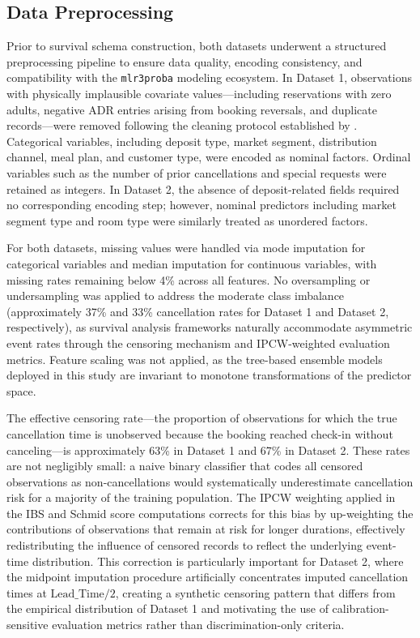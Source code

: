 \documentclass[pdflatex,sn-mathphys-ay]{sn-jnl}
\theoremstyle{thmstyleone}%
\theoremstyle{thmstyletwo}%
\theoremstyle{thmstylethree}%
\begin{document}
\subsection{Data Preprocessing}

Prior to survival schema construction, both datasets underwent a structured preprocessing pipeline to ensure data quality, encoding consistency, and compatibility with the \texttt{mlr3proba} modeling ecosystem. In Dataset 1, observations with physically implausible covariate values—including reservations with zero adults, negative ADR entries arising from booking reversals, and duplicate records—were removed following the cleaning protocol established by \cite{antonio2019data}. Categorical variables, including deposit type, market segment, distribution channel, meal plan, and customer type, were encoded as nominal factors. Ordinal variables such as the number of prior cancellations and special requests were retained as integers. In Dataset 2, the absence of deposit-related fields required no corresponding encoding step; however, nominal predictors including market segment type and room type were similarly treated as unordered factors.

For both datasets, missing values were handled via mode imputation for categorical variables and median imputation for continuous variables, with missing rates remaining below 4\% across all features. No oversampling or undersampling was applied to address the moderate class imbalance (approximately 37\% and 33\% cancellation rates for Dataset 1 and Dataset 2, respectively), as survival analysis frameworks naturally accommodate asymmetric event rates through the censoring mechanism and IPCW-weighted evaluation metrics. Feature scaling was not applied, as the tree-based ensemble models deployed in this study are invariant to monotone transformations of the predictor space.

The effective censoring rate—the proportion of observations for which the true cancellation time is unobserved because the booking reached check-in without canceling—is approximately 63\% in Dataset 1 and 67\% in Dataset 2. These rates are not negligibly small: a naive binary classifier that codes all censored observations as non-cancellations would systematically underestimate cancellation risk for a majority of the training population. The IPCW weighting applied in the IBS and Schmid score computations corrects for this bias by up-weighting the contributions of observations that remain at risk for longer durations, effectively redistributing the influence of censored records to reflect the underlying event-time distribution. This correction is particularly important for Dataset 2, where the midpoint imputation procedure artificially concentrates imputed cancellation times at $\text{Lead\_Time}/2$, creating a synthetic censoring pattern that differs from the empirical distribution of Dataset 1 and motivating the use of calibration-sensitive evaluation metrics rather than discrimination-only criteria.
\end{document}
